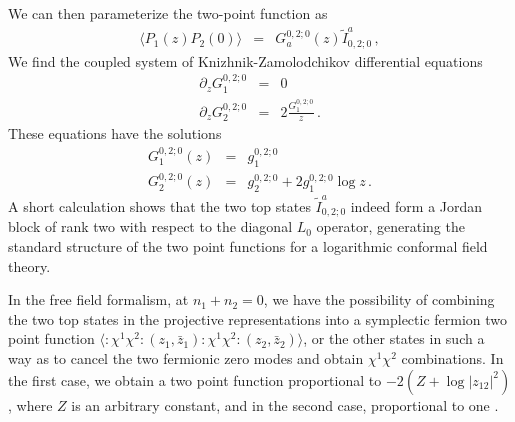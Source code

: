 \documentclass[12pt]{article}
\numberwithin{equation}{section}
\numberwithin{equation}{section}
\numberwithin{table}{section}\setlength{\multlinegap}{25pt}
\begin{document}
We can then parameterize the two-point function as
\begin{eqnarray}
\langle P_1(z) P_2(0) \rangle &=& G_a^{0,2;0}(z) \tilde{I}_{0,2;0}^a \, ,
\end{eqnarray}
 We  find the coupled system of Knizhnik-Zamolodchikov differential equations
\begin{eqnarray}
\partial_z  G_{1}^{0,2;0} &=& 0 \nonumber \\
\partial_z G_2^{0,2;0} &=& %
2 \frac{G_{1}^{0,2;0}}{z} \, .
\end{eqnarray}
These equations have the solutions
\begin{eqnarray}
G_1^{0,2;0}(z) &=& g_1^{0,2;0}
\nonumber \\
G_{2}^{0,2;0} (z) &=& g_{2}^{0,2;0} + %
2 g_1^{0,2;0}  \log z \, .
\end{eqnarray}
A  short calculation shows that the two top states $\tilde{I}^a_{0,2;0}$ 
indeed form a Jordan block of rank two with respect to the diagonal $L_0$ operator, generating the standard structure
of the two point functions for a logarithmic conformal field theory.

In the free field formalism, at $n_1+n_2=0$, we have the possibility of combining the two top states in the projective
representations into a symplectic fermion two point function 
$\langle :\chi^1 \chi^2 : (z_1,\bar{z}_1) :\chi^1 \chi^2 : (z_2,\bar{z}_2) \rangle$, or the other states in such a
way as to cancel the two fermionic zero modes and obtain $\chi^1 \chi^2$ combinations. In the first
case, we obtain a two point function proportional to  
$-2 (Z+\log |z_{12}|^2)$, where $Z$ is an arbitrary constant, and in the second case, proportional to one \cite{Kausch:2000fu}.
\end{document}
